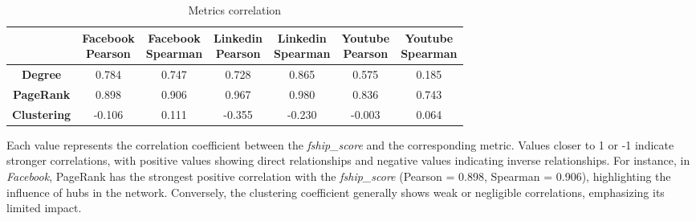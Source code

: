 \documentclass{article}
\begin{document}
\begin{table}[H]
    \centering
    \begin{tabular}{|c|c|c|c|c|c|c|}
        \hline
        & \makecell{Facebook \\ Pearson} & \makecell{Facebook \\ Spearman} & \makecell{Linkedin \\ Pearson}
         & \makecell{Linkedin \\ Spearman} & \makecell{Youtube \\ Pearson} & \makecell{Youtube \\ Spearman} \\ \hline
        \textbf{Degree} & 0.784 & 0.747   & 0.728             & 0.865           & 0.575           & 0.185       \\  \hline

        \textbf{PageRank} & 0.898 & 0.906 & 0.967 & 0.980 & 0.836 & 0.743 \\ \hline

        \textbf{Clustering} &  -0.106 &  0.111 & -0.355 & -0.230 & -0.003 & 0.064\\ \hline
    \end{tabular}
    \caption{Metrics correlation}
\end{table} 

Each value represents the correlation coefficient between the \textit{fship\_score} and the corresponding metric. Values closer to 1 or -1 indicate stronger correlations, with positive values showing direct relationships and negative values indicating inverse relationships.
For instance, in \textit{Facebook}, PageRank has the strongest positive correlation with the \textit{fship\_score} (Pearson = 0.898, Spearman = 0.906), highlighting the influence of hubs in the network. Conversely, the clustering coefficient generally shows weak or negligible correlations, emphasizing its limited impact.
\end{document}

